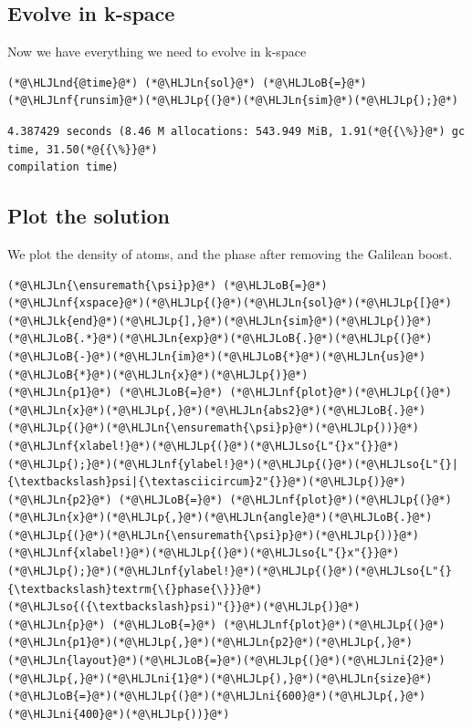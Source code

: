 \documentclass[12pt,a4paper]{article}
\newcommand{\HLJLk}[1]{\textcolor[RGB]{148,91,176}{\textbf{#1}}}
\newcommand{\HLJLn}[1]{#1}
\newcommand{\HLJLnd}[1]{\textcolor[RGB]{214,102,97}{#1}}
\newcommand{\HLJLnf}[1]{\textcolor[RGB]{66,102,213}{#1}}
\newcommand{\HLJLso}[1]{\textcolor[RGB]{201,61,57}{#1}}
\newcommand{\HLJLni}[1]{\textcolor[RGB]{59,151,46}{#1}}
\newcommand{\HLJLoB}[1]{\textcolor[RGB]{102,102,102}{\textbf{#1}}}
\newcommand{\HLJLp}[1]{#1}
\begin{document}
\subsection{Evolve in k-space}
Now we have everything we need to evolve in k-space


\begin{lstlisting}
(*@\HLJLnd{@time}@*) (*@\HLJLn{sol}@*) (*@\HLJLoB{=}@*) (*@\HLJLnf{runsim}@*)(*@\HLJLp{(}@*)(*@\HLJLn{sim}@*)(*@\HLJLp{);}@*)
\end{lstlisting}

\begin{lstlisting}
4.387429 seconds (8.46 M allocations: 543.949 MiB, 1.91(*@{{\%}}@*) gc time, 31.50(*@{{\%}}@*) 
compilation time)
\end{lstlisting}


\subsection{Plot the solution}
We plot the density of atoms, and the phase after removing the Galilean boost.


\begin{lstlisting}
(*@\HLJLn{\ensuremath{\psi}p}@*) (*@\HLJLoB{=}@*) (*@\HLJLnf{xspace}@*)(*@\HLJLp{(}@*)(*@\HLJLn{sol}@*)(*@\HLJLp{[}@*)(*@\HLJLk{end}@*)(*@\HLJLp{],}@*)(*@\HLJLn{sim}@*)(*@\HLJLp{)}@*)(*@\HLJLoB{.*}@*)(*@\HLJLn{exp}@*)(*@\HLJLoB{.}@*)(*@\HLJLp{(}@*)(*@\HLJLoB{-}@*)(*@\HLJLn{im}@*)(*@\HLJLoB{*}@*)(*@\HLJLn{us}@*)(*@\HLJLoB{*}@*)(*@\HLJLn{x}@*)(*@\HLJLp{)}@*)
(*@\HLJLn{p1}@*) (*@\HLJLoB{=}@*) (*@\HLJLnf{plot}@*)(*@\HLJLp{(}@*)(*@\HLJLn{x}@*)(*@\HLJLp{,}@*)(*@\HLJLn{abs2}@*)(*@\HLJLoB{.}@*)(*@\HLJLp{(}@*)(*@\HLJLn{\ensuremath{\psi}p}@*)(*@\HLJLp{))}@*)
(*@\HLJLnf{xlabel!}@*)(*@\HLJLp{(}@*)(*@\HLJLso{L"{}x"{}}@*)(*@\HLJLp{);}@*)(*@\HLJLnf{ylabel!}@*)(*@\HLJLp{(}@*)(*@\HLJLso{L"{}|{\textbackslash}psi|{\textasciicircum}2"{}}@*)(*@\HLJLp{)}@*)
(*@\HLJLn{p2}@*) (*@\HLJLoB{=}@*) (*@\HLJLnf{plot}@*)(*@\HLJLp{(}@*)(*@\HLJLn{x}@*)(*@\HLJLp{,}@*)(*@\HLJLn{angle}@*)(*@\HLJLoB{.}@*)(*@\HLJLp{(}@*)(*@\HLJLn{\ensuremath{\psi}p}@*)(*@\HLJLp{))}@*)
(*@\HLJLnf{xlabel!}@*)(*@\HLJLp{(}@*)(*@\HLJLso{L"{}x"{}}@*)(*@\HLJLp{);}@*)(*@\HLJLnf{ylabel!}@*)(*@\HLJLp{(}@*)(*@\HLJLso{L"{}{\textbackslash}textrm{\{}phase{\}}}@*) (*@\HLJLso{({\textbackslash}psi)"{}}@*)(*@\HLJLp{)}@*)
(*@\HLJLn{p}@*) (*@\HLJLoB{=}@*) (*@\HLJLnf{plot}@*)(*@\HLJLp{(}@*)(*@\HLJLn{p1}@*)(*@\HLJLp{,}@*)(*@\HLJLn{p2}@*)(*@\HLJLp{,}@*)(*@\HLJLn{layout}@*)(*@\HLJLoB{=}@*)(*@\HLJLp{(}@*)(*@\HLJLni{2}@*)(*@\HLJLp{,}@*)(*@\HLJLni{1}@*)(*@\HLJLp{),}@*)(*@\HLJLn{size}@*)(*@\HLJLoB{=}@*)(*@\HLJLp{(}@*)(*@\HLJLni{600}@*)(*@\HLJLp{,}@*)(*@\HLJLni{400}@*)(*@\HLJLp{))}@*)
\end{lstlisting}
\end{document}
